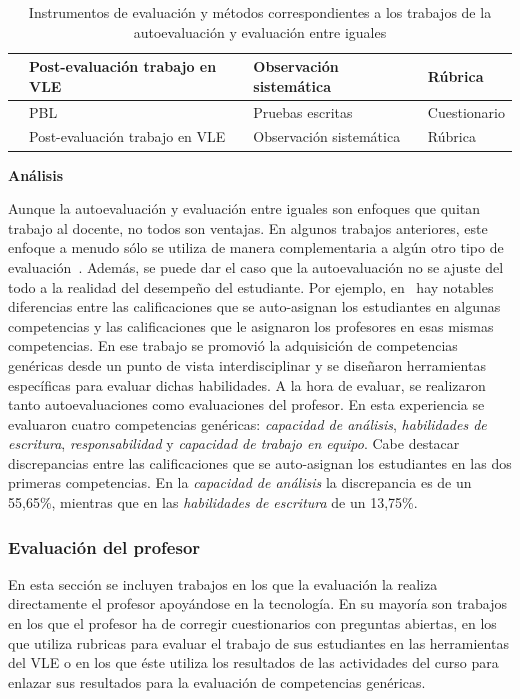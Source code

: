 \begin{table}
\begin{center}
\begin{tabular}{| c | m{5.5cm} | m{4.5cm} | m{3cm} |}
    \hline
    \cite{carreras2013promotion} &  Post-evaluación trabajo en VLE & Observación sistemática & Rúbrica \\
    \hline
    \cite{martinez2014teamwork} & PBL & Pruebas escritas & Cuestionario \\
    \hline
    \cite{oliver2013graduate} &  Post-evaluación trabajo en VLE & Observación sistemática & Rúbrica \\
    \hline
  \end{tabular}
\end{center}
\caption{Instrumentos de evaluación y métodos correspondientes a los trabajos de la autoevaluación y evaluación entre iguales}
\label{tab:MetodosAuto}
\end{table}

\bigskip
\textbf{Análisis}
\bigskip

Aunque la autoevaluación y evaluación entre iguales son enfoques que quitan trabajo al docente, no todos son ventajas. En algunos trabajos anteriores, este enfoque a menudo sólo se utiliza de manera complementaria a algún otro tipo de evaluación~\cite{lasa2013problem,sevilla2012assessment}. Además, se puede dar el caso que la autoevaluación no se ajuste del todo a la realidad del desempeño del estudiante. Por ejemplo, en~\cite{carreras2013promotion} hay notables diferencias entre las calificaciones que se auto-asignan los estudiantes en algunas competencias y las calificaciones que le asignaron los profesores en esas mismas competencias. En ese trabajo se promovió la adquisición de competencias genéricas desde un punto de vista interdisciplinar y se diseñaron herramientas específicas para evaluar dichas habilidades. A la hora de evaluar, se realizaron tanto autoevaluaciones como evaluaciones del profesor. En esta experiencia se evaluaron cuatro competencias genéricas: \emph{capacidad de análisis},  \emph{habilidades de escritura}, \emph{responsabilidad} y \emph{capacidad de trabajo en equipo}. Cabe destacar discrepancias entre las calificaciones que se auto-asignan los estudiantes en las dos primeras competencias. En la \emph{capacidad de análisis} la discrepancia es de un 55,65\%, mientras que en las \emph{habilidades de escritura} de un 13,75\%.


\subsubsection{Evaluación del profesor}

En esta sección se incluyen trabajos en los que la evaluación la realiza directamente el profesor apoyándose en la tecnología. En su mayoría son trabajos en los que el profesor ha de corregir cuestionarios con preguntas abiertas, en los que utiliza rubricas para evaluar el trabajo de sus estudiantes en las herramientas del VLE o en los que éste utiliza los resultados de las actividades del curso para enlazar sus resultados para la evaluación de competencias genéricas.

